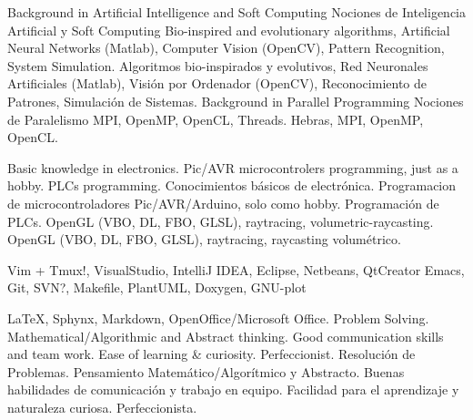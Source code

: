 \documentclass[11pt,a4paper,sans]{moderncv}
\begin{document}
\cvcomputer
    {\translate
    {Background in Artificial Intelligence and Soft Computing}
    {Nociones de Inteligencia Artificial y Soft Computing}}
        {\translate
        {Bio-inspired and evolutionary algorithms, Artificial Neural Networks
        (Matlab), Computer Vision (OpenCV), Pattern Recognition, System
        Simulation.}
        {Algoritmos bio-inspirados y evolutivos, Red Neuronales Artificiales
        (Matlab), Visión por Ordenador (OpenCV), Reconocimiento de Patrones,
        Simulación de Sistemas.}}
    {\translate
    {Background in Parallel Programming}
    {Nociones de Paralelismo}}
        {\translate
        {MPI, OpenMP, OpenCL, Threads.}
        {Hebras, MPI, OpenMP, OpenCL.}}


\cvcomputer
    {}
        {\translate
        {Basic knowledge in electronics. Pic/AVR microcontrolers programming,
        just as a hobby. PLCs programming.}
        {Conocimientos básicos de electrónica. Programacion de
        microcontroladores Pic/AVR/Arduino, solo como hobby. Programación de
        PLCs.}}
    {}
        {\translate
        {OpenGL (VBO, DL, FBO, GLSL), raytracing, volumetric-raycasting.}
        {OpenGL (VBO, DL, FBO, GLSL), raytracing, raycasting volumétrico.}}


\cvcomputer
    {}
        {Vim + Tmux!, VisualStudio, IntelliJ IDEA, Eclipse, Netbeans,
        QtCreator}
    {}
        {Emacs, Git, SVN?, Makefile, PlantUML, Doxygen, GNU-plot}

\cvcomputer
    {}
        {\LaTeX, Sphynx, Markdown,  OpenOffice/Microsoft Office.}
    {}
        {\translate
        {Problem Solving. Mathematical/Algorithmic and Abstract thinking. Good
        communication skills and team work. Ease of learning \& curiosity.
        Perfeccionist.}
        {Resolución de Problemas. Pensamiento Matemático/Algorítmico y
        Abstracto. Buenas habilidades de comunicación y trabajo en equipo.
        Facilidad para el aprendizaje y naturaleza curiosa.  Perfeccionista.}}
\end{document}

